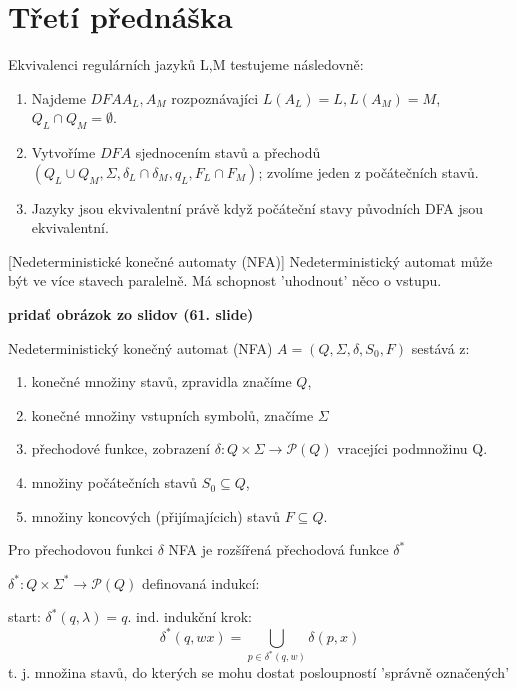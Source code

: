 \documentclass[../main.tex]{subfiles}
\begin{document}
\section{Třetí přednáška}

\begin{definition}
    Ekvivalenci regulárních jazyků L,M testujeme následovně:
    \begin{enumerate}
        \item Najdeme $DFA A_L, A_M$ rozpoznávajíci $L(A_L) = L, L(A_M) = M$, $Q_L \cap Q_M = \emptyset$.
        \item Vytvoříme $DFA$ sjednocením stavů a přechodů $(Q_L \cup Q_M, \Sigma, \delta_L \cap \delta_M, q_L, F_L \cap F_M)$;
         zvolíme jeden z počátečních stavů.
        \item Jazyky jsou ekvivalentní právě když počáteční stavy původních DFA jsou ekvivalentní. 
    \end{enumerate}
\end{definition}[Nedeterministické konečné automaty (NFA)]
    Nedeterministický automat může být ve více stavech paralelně. Má schopnost 'uhodnout' něco o vstupu.

    \textbf{ pridať obrázok zo slidov (61. slide)}

\begin{definition}[NFA]
    Nedeterministický konečný automat (NFA) $A = (Q, \Sigma, \delta, S_0, F)$ sestává z:
    \begin{enumerate}
        \item konečné množiny stavů, zpravidla značíme $Q$,
        \item konečné množiny vstupních symbolů, značíme $\Sigma$
        \item přechodové funkce, zobrazení $\delta : Q \times \Sigma \rightarrow \mathcal{P}(Q)$ vracejíci podmnožinu Q.
        \item množiny počátečních stavů $S_0 \subseteq Q$,
        \item množiny koncových (přijímajícich) stavů $F \subseteq Q$.
    \end{enumerate}
\end{definition}

\begin{definition}
    Pro přechodovou funkci $\delta$ NFA je rozšířená přechodová funkce $\delta^*$

    $\delta^* : Q \times \Sigma^* \rightarrow \mathcal{P}(Q)$ definovaná indukcí:

    start: $\delta^*(q,\lambda) = {q}.$
    ind. indukční krok:
    \[\delta^*(q,wx) = \bigcup_{p\in \delta^*(q,w)}\delta(p,x)\]
    t. j. množina stavů, do kterých se mohu dostat posloupností 'správně označených'
\end{definition}
\end{document}
